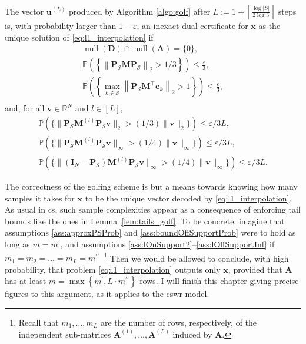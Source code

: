 \begin{lemma}\label{lem:tails_golf} The vector $\mathbf{u}^{(L)}$ produced by Algorithm \ref{algo:golf} after $L := 1 + \left \lceil \frac{\log |S|}{2 \log 3} \right \rceil$ steps is, with probability larger than $1 - \varepsilon$, an inexact dual certificate for $\mathbf{x}$ as the unique solution of \ref{eq:l1_interpolation} if
\begin{align*}
    \tag{A1} \operatorname{null} \left ( \mathbf{D} \right ) \cap \operatorname{null} \left ( \mathbf{A} \right ) = \{ 0 \}, \\
    \tag{A2} \label{ass:approxPSProb} \mathbb{P} \left ( \left \{  \left \| \mathbf{P}_\mathcal{S} \mathbf{M} \mathbf{P}_\mathcal{S} \right \|_{2} > 1 / 3 \right \}\right ) \leq \frac{\varepsilon}{3}, \\
    \tag{A3} \label{ass:boundOffSupportProb} \mathbb{P} \left ( \left \{  \underset{k \notin \mathcal{S}}{\max} \left \| \mathbf{P}_\mathcal{S} \mathbf{M}^{\top} \mathbf{e}_k \right \|_2 > 1 \right \}\right ) \leq\frac{\varepsilon}{3}, \\
\end{align*}
and, for all $\mathbf{v} \in \mathbb{R}^{N}$ and $l \in [L]$,
\begin{align}
    \tag{A5-l} \label{ass:lOnSupport2} \mathbb{P} ( \{ \| \mathbf{P}_\mathcal{S} \mathbf{M}^{(l)} \mathbf{P}_\mathcal{S} \mathbf{v} \|_2 > (1/3) \| \mathbf{v} \|_2 \} ) \leq \varepsilon / 3 L, \\
    \tag{A6(a)-l} \label{ass:lOnSupportInf} \mathbb{P} ( \{ \| \mathbf{P}_\mathcal{S} \mathbf{M}^{(l)} \mathbf{P}_\mathcal{S} \mathbf{v} \|_\infty > (1/4) \| \mathbf{v} \|_\infty \} ) \leq \varepsilon / 3 L, \\
    \tag{A6(b)-l} \label{ass:lOffSupportInf} \mathbb{P} ( \{ \| (\mathbf{I}_N - \mathbf{P}_\mathcal{S}) \mathbf{M}^{(l)} \mathbf{P}_\mathcal{S} \mathbf{v} \|_\infty > (1/4) \| \mathbf{v} \|_\infty \} ) \leq \varepsilon / 3 L.
\end{align}
\end{lemma}

The correctness of the golfing scheme is but a means towards knowing how many samples it takes for $\mathbf{x}$ to be the unique vector decoded by \ref{eq:l1_interpolation}. As usual in \acrlong{cs}, such sample complexities appear as a consequence of enforcing tail bounds like the ones in Lemma~\ref{lem:tails_golf}. To be concrete, imagine that assumptions \ref{ass:approxPSProb} and \ref{ass:boundOffSupportProb} were to hold as long as $m = m^{\prime}$, and assumptions \ref{ass:lOnSupport2}--\ref{ass:lOffSupportInf} if $m_1 = m_2 = \dots = m_L = m^{\prime\prime}$~\footnote{Recall that $m_1, \dots, m_L$ are the number of rows, respectively, of the independent sub-matrices $\mathbf{A}^{(1)}, \dots, \mathbf{A}^{(L)}$ induced by $\mathbf{A}$.} Then we would be allowed to conclude, with high probability, that problem \ref{eq:l1_interpolation} outputs only $\mathbf{x}$, provided that $\mathbf{A}$ has at least $m = \max \left \{ m^{\prime}, L \cdot m^{\prime\prime}\right \}$ rows. I will finish this chapter giving precise figures to this argument, as it applies to the \acrfull{cswr} model.